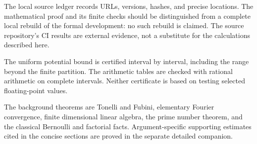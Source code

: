 The local source ledger records URLs, versions, hashes, and precise
locations. The mathematical proof and its finite checks should be
distinguished from a complete local rebuild of the formal development:
no such rebuild is claimed. The source repository's CI results are
external evidence, not a substitute for the calculations described here.

The uniform potential bound is certified interval by interval, including
the range beyond the finite partition. The arithmetic tables are checked
with rational arithmetic on complete intervals. Neither certificate is
based on testing selected floating-point values.

The background theorems are Tonelli and Fubini, elementary Fourier
convergence, finite dimensional linear algebra, the prime number theorem,
and the classical Bernoulli and factorial facts. Argument-specific
supporting estimates cited in the concise sections are proved in the
separate detailed companion.
